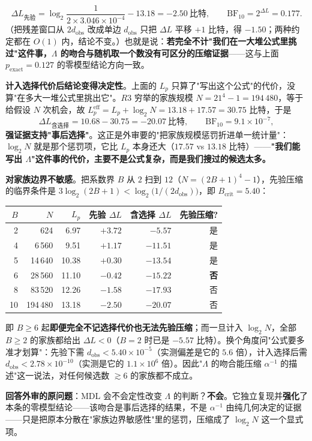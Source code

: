 \documentclass[12pt,a4paper]{article}
\begin{document}
\begin{enumerate}
  \[
    \Delta L_{\text{先验}} = \log_2\frac{1}{2\times3.046\times10^{-4}} - 13.18 = -2.50~\text{比特},\qquad \mathrm{BF}_{10} = 2^{\Delta L} = 0.177 .
  \]
  （把残差窗口从 $2d_{\mathrm{obs}}$ 改成单边 $d_{\mathrm{obs}}$ 只把 $\Delta L$ 平移 $+1$ 比特，得 $-1.50$；两种约定都在 $O(1)$ 内，结论不变。）也就是说：\textbf{若完全不计"我们在一大堆公式里挑过"这件事，$\Lambda$ 的吻合与随机取一个数没有可区分的压缩证据}——这与上面 $p_{\mathrm{exact}} = 0.127$ 的零模型结论方向一致。
  \par\medskip\noindent\textbf{计入选择代价后结论变得决定性}。上面的 $L_p$ 只算了"写出这个公式"的代价，没算"在多大一堆公式里挑出它"。$R3$ 穷举的家族规模 $N = 21^4-1 = 194\,480$，等于给假设 $N$ 次机会，故 $L_p^{\text{eff}} = L_p + \log_2 N = 13.18 + 17.57 = 30.75$ 比特，于是
  \[
    \Delta L_{\text{含选择}} = 10.68 - 30.75 = -20.07~\text{比特},\qquad \mathrm{BF}_{10} = 9.1\times10^{-7},
  \]
  \textbf{强证据支持"事后选择"}。这正是外审要的"把家族规模惩罚折进单一统计量"：$\log_2 N$ 就是那个惩罚项，它比 $L_p$ 本身还大（$17.57$ vs $13.18$ 比特）——\textbf{"我们能写出 $\Lambda$"这件事的代价，主要不是公式复杂，而是我们搜过的候选太多。}
  \par\medskip\noindent\textbf{对家族边界不敏感}。把系数界 $B$ 从 $2$ 扫到 $12$（$N = (2B+1)^4-1$），先验压缩的临界条件是 $3\log_2(2B+1) < \log_2\!\bigl(1/(2d_{\mathrm{obs}})\bigr)$，即 $B_{\text{crit}} = 5.40$：
  \begin{center}
  \footnotesize
  \begin{tabular}{@{}rrrrrr@{}}
  \toprule
  $B$ & $N$ & $L_p$ & \textbf{先验} $\Delta L$ & \textbf{含选择} $\Delta L$ & \textbf{先验压缩?} \\
  \midrule
  2 & 624 & 6.97 & $+3.72$ & $-5.57$ & 是 \\
  4 & 6\,560 & 9.51 & $+1.17$ & $-11.51$ & 是 \\
  5 & 14\,640 & 10.38 & $+0.30$ & $-13.54$ & 是 \\
  6 & 28\,560 & 11.10 & $-0.42$ & $-15.22$ & \textbf{否} \\
  8 & 83\,520 & 12.26 & $-1.58$ & $-17.93$ & 否 \\
  10 & 194\,480 & 13.18 & $-2.50$ & $-20.07$ & 否 \\
  \bottomrule
  \end{tabular}
  \end{center}
  \noindent 即 $B\ge6$ 起\textbf{即便完全不记选择代价也无法先验压缩}；而一旦计入 $\log_2 N$，全部 $B\ge2$ 的家族都给出 $\Delta L<0$（$B=2$ 时已是 $-5.57$ 比特）。换个角度问"公式要多准才划算"：先验下需 $d_{\mathrm{obs}} < 5.40\times10^{-5}$（实测偏差是它的 $5.6$ 倍），计入选择后需 $d_{\mathrm{obs}} < 2.78\times10^{-10}$（实测是它的 $1.1\times10^{6}$ 倍）。因此"$\Lambda$ 的吻合能压缩 $\alpha^{-1}$ 的描述"这一说法，对任何候选数 $\gtrsim 6$ 的家族都不成立。
  \par\medskip\noindent\textbf{回答外审的原问题}：MDL 会不会定性改变 $\Lambda$ 的判断？\textbf{不会}。它独立复现并\textbf{强化}了本条的零模型结论——该吻合是事后选择的结果，不是 $\alpha^{-1}$ 由纯几何决定的证据——只是把原本分散在"家族边界敏感性"里的惩罚，压缩成了 $\log_2 N$ 这一个显式项。
\end{enumerate}
\end{document}
